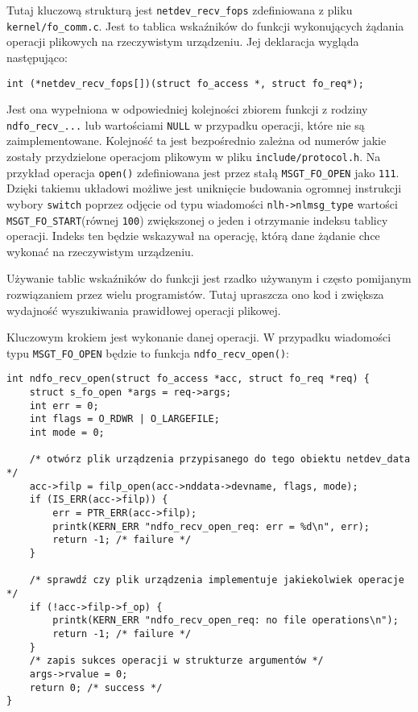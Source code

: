 Tutaj kluczową strukturą jest \texttt{netdev\_recv\_fops} zdefiniowana z
pliku \texttt{kernel/fo\_comm.c}. Jest to tablica wskaźników do funkcji
wykonujących żądania operacji plikowych na rzeczywistym urządzeniu. Jej
deklaracja wygląda następująco:

\begin{verbatim}
int (*netdev_recv_fops[])(struct fo_access *, struct fo_req*);
\end{verbatim}

Jest ona wypełniona w odpowiedniej kolejności zbiorem funkcji z rodziny
\texttt{ndfo\_recv\_...} lub wartościami \texttt{NULL} w przypadku
operacji, które nie są zaimplementowane. Kolejność ta jest bezpośrednio
zależna od numerów jakie zostały przydzielone operacjom plikowym w pliku
\texttt{include/protocol.h}. Na przykład operacja \texttt{open()}
zdefiniowana jest przez stałą \texttt{MSGT\_FO\_OPEN} jako \texttt{111}.
Dzięki takiemu układowi możliwe jest uniknięcie budowania ogromnej
instrukcji wybory \texttt{switch} poprzez odjęcie od typu wiadomości
\texttt{nlh-\textgreater{}nlmsg\_type} wartości
\texttt{MSGT\_FO\_START}(równej \texttt{100}) zwiększonej o jeden i
otrzymanie indeksu tablicy operacji. Indeks ten będzie wskazywał na
operację, którą dane żądanie chce wykonać na rzeczywistym urządzeniu.

Używanie tablic wskaźników do funkcji jest rzadko używanym i często
pomijanym rozwiązaniem przez wielu programistów. Tutaj upraszcza ono kod
i zwiększa wydajność wyszukiwania prawidłowej operacji plikowej.

Kluczowym krokiem jest wykonanie danej operacji. W przypadku wiadomości
typu \texttt{MSGT\_FO\_OPEN} będzie to funkcja
\texttt{ndfo\_recv\_open()}:

\begin{verbatim}
int ndfo_recv_open(struct fo_access *acc, struct fo_req *req) {
    struct s_fo_open *args = req->args;
    int err = 0;
    int flags = O_RDWR | O_LARGEFILE;
    int mode = 0;

    /* otwórz plik urządzenia przypisanego do tego obiektu netdev_data */
    acc->filp = filp_open(acc->nddata->devname, flags, mode);
    if (IS_ERR(acc->filp)) {
        err = PTR_ERR(acc->filp);
        printk(KERN_ERR "ndfo_recv_open_req: err = %d\n", err);
        return -1; /* failure */
    }

    /* sprawdź czy plik urządzenia implementuje jakiekolwiek operacje */
    if (!acc->filp->f_op) {
        printk(KERN_ERR "ndfo_recv_open_req: no file operations\n");
        return -1; /* failure */
    }
    /* zapis sukces operacji w strukturze argumentów */
    args->rvalue = 0;
    return 0; /* success */
}
\end{verbatim}


